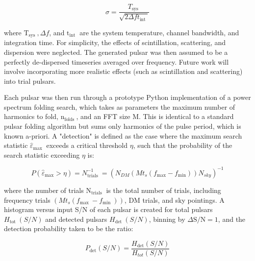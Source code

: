\documentclass[10pt]{article}
\begin{document}
\[
\sigma=\frac{T_{\text {sys }}}{\sqrt{2 \Delta f t_{\text {int }}}}
\]

where \(\mathrm{T}_{\text {sys }}, \Delta f\), and \(\mathrm{t}_{\text {int }}\) are the system temperature, channel bandwidth, and integration time. For simplicity, the effects of scintillation, scattering, and dispersion were neglected. The generated pulsar was then assumed to be a perfectly de-dispersed timeseries averaged over frequency. Future work will involve incorporating more realistic effects (such as scintillation and scattering) into trial pulsars.

Each pulsar was then run through a prototype Python implementation of a power spectrum folding search, which takes as parameters the maximum number of harmonics to fold, \(\mathrm{n}_{\text {folds }}\), and an FFT size M. This is identical to a standard pulsar folding algorithm but sums only harmonics of the pulse period, which is known a-priori. A "detection" is defined as the case where the maximum search statistic \(\widehat{\varepsilon}_{\text {max }}\) exceeds a critical threshold \(\eta\), such that the probability of the search statistic exceeding \(\eta\) is:

\[
P\left(\hat{\varepsilon}_{\max }>\eta\right)=N_{\text {trials }}^{-1}=\left(N_{D M}\left(M t_{s}\left(f_{\max }-f_{\min }\right)\right) N_{s k y}\right)^{-1}
\]

where the number of trials \(\mathrm{N}_{\text {trials }}\) is the total number of trials, including frequency trials \(\left(M t_{s}\left(f_{\text {max }}-f_{\text {min }}\right)\right)\), DM trials, and sky pointings. A histogram versus input S/N of each pulsar is created for total pulsars \(H_{\text {tot }}(S / N)\) and detected pulsars \(H_{\text {det }}(S / N)\), binning by \(\Delta \mathrm{S} / \mathrm{N}=1\), and the detection probability taken to be the ratio:

\[
P_{\operatorname{det}}(S / N)=\frac{H_{\operatorname{det}}(S / N)}{H_{t o t}(S / N)}
\]
\end{document}
